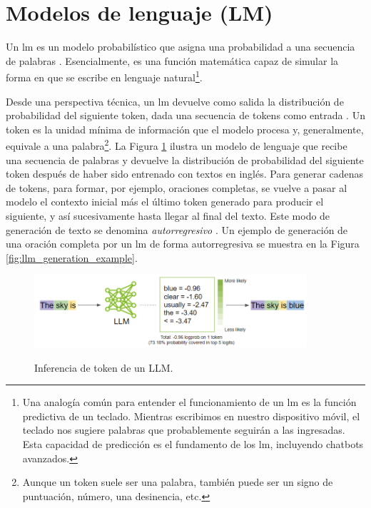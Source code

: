 \section{Modelos de lenguaje (LM)}

Un \gls{lm} es un modelo probabilístico que asigna una probabilidad a una secuencia de palabras \citep{ModelacionLenguaje2024}. Esencialmente, es una función matemática capaz de simular la forma en que se escribe en lenguaje natural\footnote{Una analogía común para entender el funcionamiento de un \gls{lm} es la función predictiva de un teclado. Mientras escribimos en nuestro dispositivo móvil, el teclado nos sugiere palabras que probablemente seguirán a las ingresadas. Esta capacidad de predicción es el fundamento de los \gls{lm}, incluyendo chatbots avanzados.}.

Desde una perspectiva técnica, un \gls{lm} devuelve como salida la distribución de probabilidad del siguiente token, dada una secuencia de tokens como entrada \citep{GenerationLLMs}. Un token es la unidad mínima de información que el modelo procesa y, generalmente, equivale a una palabra\footnote{Aunque un token suele ser una palabra, también puede ser un signo de puntuación, número, una desinencia, etc.}.  La Figura \ref{fig:llm_generation} ilustra un modelo de lenguaje que recibe una secuencia de palabras y devuelve la distribución de probabilidad del siguiente token después de haber sido entrenado con textos en inglés. Para generar cadenas de tokens, para formar, por ejemplo, oraciones completas, se vuelve a pasar al modelo el contexto inicial más el último token generado para producir el siguiente, y así sucesivamente hasta llegar al final del texto. Este modo de generación de texto se denomina \emph{autorregresivo} \citep{malachAutoRegressiveNextTokenPredictors2023}. Un ejemplo de generación de una oración completa por un \gls{lm} de forma autorregresiva se muestra en la Figura \ref{fig:llm_generation_example}.

\begin{figure}[H]
    \caption[Inferencia de token de un LLM]{Inferencia de token de un LLM.}
    \centering
    \includegraphics[width=0.9\textwidth]{./figuras/LLM_predice_token.png}
    \label{fig:llm_generation}
\end{figure}

